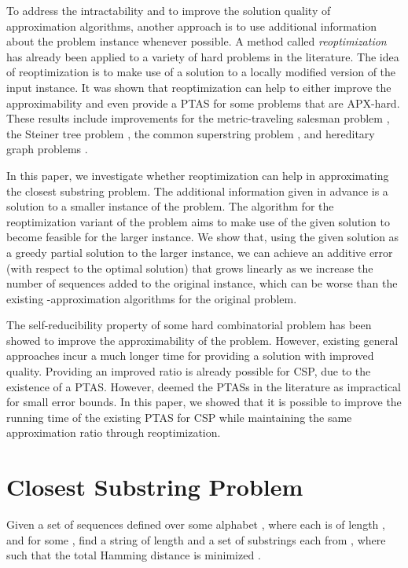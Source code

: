 \documentclass[journal]{acm_proc_article-sp}
\begin{document}
To address the intractability and to improve the solution quality of approximation algorithms, another approach is to use additional information about the problem instance whenever possible. A method called \textit{reoptimization} has already been applied to a variety of hard problems in the literature. The idea of reoptimization is to make use of a solution to a locally modified version of the input instance. It was shown that reoptimization can help to either improve the approximability and even provide a PTAS for some problems that are APX-hard. These results include improvements for the metric-traveling salesman problem \cite{Bockenhauer2008}, the Steiner tree problem \cite{Bilo2012}, the common superstring problem  \cite{Bilo2011}, and hereditary graph problems \cite{Boria2012}.

In this paper, we investigate whether reoptimization can help in approximating the closest substring problem. The additional information given in advance is a solution to a smaller instance of the problem. The algorithm for the reoptimization variant of the problem aims to make use of the given solution to become feasible for the larger instance. We show that, using the given solution as a greedy partial solution to the larger instance, we can achieve an additive error (with respect to the optimal solution) that grows linearly as we increase the number of sequences added to the original instance, which can be worse than the existing -approximation algorithms for the original problem. 

The self-reducibility property of some hard combinatorial problem has been showed to improve the approximability of the problem. However, existing general approaches incur a much longer time for providing a solution with improved quality. Providing an improved ratio is already possible for CSP, due to the existence of  a PTAS.   However, \cite{Wang2008} deemed the PTASs in the literature as impractical for small error bounds. In this paper, we showed that it is possible to improve the running time of the existing PTAS  for CSP while maintaining the same approximation ratio through reoptimization.

\section{Closest Substring Problem}
Given a set of sequences  defined over some alphabet , where each  is of length , and for some , find a string  of length  and a set of substrings  each from , where   such that the total Hamming distance  is minimized \cite{Garey1979}.
\end{document}
